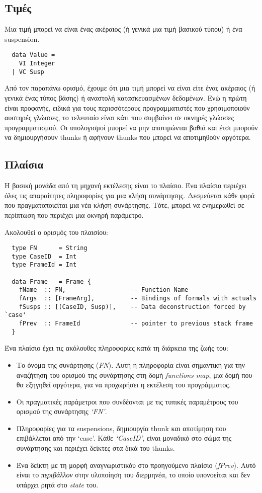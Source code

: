 \documentclass[diploma]{softlab-thesis}
\begin{document}
\subsection{Τιμές}

Μια τιμή μπορεί να είναι ένας ακέραιος (ή γενικά μια τιμή βασικού τύπου) ή ένα suspension.
\begin{verbatim}
  data Value = 
    VI Integer 
  | VC Susp 
\end{verbatim}

Από τον παραπάνω ορισμό, έχουμε ότι μια τιμή μπορεί να είναι είτε ένας ακέραιος (ή γενικά ένας τύπος βάσης) ή αναστολή κατασκευασμένων δεδομένων. 
Ενώ η πρώτη είναι προφανής, ειδικά για τους περισσότερους προγραμματιστές που χρησιμοποιούν αυστηρές γλώσσες, το τελευταίο είναι κάτι που συμβαίνει σε οκνηρές
γλώσσες προγραμματισμού. Οι υπολογισμοί μπορεί να μην αποτιμώνται βαθιά και έτσι μπορούν να δημιουργήσουν thunks ή
αφήνουν thunks που μπορεί να αποτιμηθούν αργότερα.

\subsection{Πλαίσια}

Η βασική μονάδα από τη μηχανή εκτέλεσης είναι το πλαίσιο. Ένα πλαίσιο περιέχει όλες τις απαραίτητες πληροφορίες
για μια κλήση συνάρτησης. Δεσμεύεται κάθε φορά που πραγματοποιείται μια νέα κλήση συνάρτησης. Τότε, μπορεί να ενημερωθεί σε περίπτωση που περιέχει
μια οκνηρή παράμετρο.

Ακολουθεί ο ορισμός του πλαισίου:
\begin{verbatim}
  type FN      = String 
  type CaseID  = Int 
  type FrameId = Int 

  data Frame   = Frame {
    fName  :: FN,                  -- Function Name
    fArgs  :: [FrameArg],          -- Bindings of formals with actuals
    fSusps :: [(CaseID, Susp)],    -- Data deconstruction forced by `case'
    fPrev  :: FrameId              -- pointer to previous stack frame 
  }
\end{verbatim}

Ένα πλαίσιο έχει τις ακόλουθες πληροφορίες κατά τη διάρκεια της ζωής του:
\begin{itemize}
  \item Το όνομα της συνάρτησης (\textit{FN}). Αυτή η πληροφορία είναι σημαντική για την αναζήτηση του ορισμού της συνάρτησης στη δομή
  \textit{functions map}, μια δομή που θα εξηγηθεί αργότερα, για να προχωρήσει η εκτέλεση του προγράμματος.
  \item Οι πραγματικές παράμετροι που συνδέονται με τις τυπικές παραμέτρους του ορισμού της συνάρτησης \textit{`FN'}.
  \item Πληροφορίες για τα suspensions, δημιουργία thunk και αποτίμηση που επιβάλλεται από την `case'. Κάθε \textit{`CaseID'}, 
  είναι μοναδικό στο σώμα της συνάρτησης και περιέχει δείκτες στα δικά του thunks.
  \item Ένα δείκτη με τη μορφή αναγνωριστικόυ στο προηγούμενο πλαίσιο (\textit{fPrev}). Αυτό είναι το \textit{περιβάλλον} στην υλοποίηση του 
  διερμηνέα, το οποίο υπονοείται και δεν υπάρχει ρητά στο \textit{state} του.
\end{itemize} 
\end{document}
